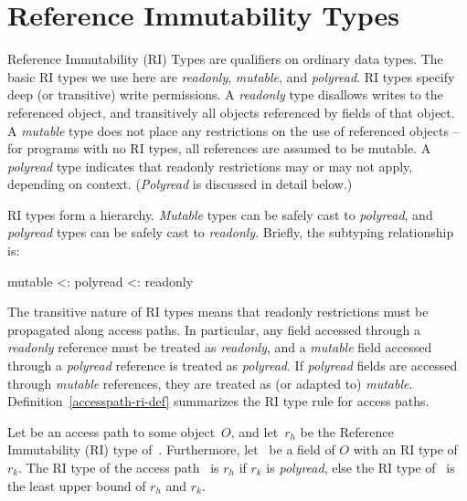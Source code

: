 
\section{Reference Immutability Types}

Reference Immutability (RI) Types are qualifiers on ordinary data types.
The basic RI types we use here are \emph{readonly}, \emph{mutable}, and \emph{polyread}.
RI types specify deep (or transitive) write permissions.
A \emph{readonly} type disallows writes to the referenced object, and transitively
all objects referenced by fields of that object.
A \emph{mutable} type does not place any restrictions on the use of referenced objects --
for programs with no RI types, all references are assumed to be mutable.
A \emph{polyread} type indicates that readonly restrictions may or may not apply,
depending on context. (\emph{Polyread} is discussed in detail below.)

RI types form a hierarchy.
\emph{Mutable} types can be safely cast to \emph{polyread},
and \emph{polyread} types can be safely cast to \emph{readonly}.
Briefly, the subtyping relationship is:

\begin{center}
	mutable <: polyread <: readonly
\end{center}

The transitive nature of RI types means that readonly restrictions must be
propagated along access paths.
In particular, any field accessed through a \emph{readonly} reference must
be treated as \emph{readonly}, and a \emph{mutable} field accessed through
a \emph{polyread} reference is treated as \emph{polyread}.
If \emph{polyread} fields are accessed through \emph{mutable} references,
they are treated as (or adapted to) \emph{mutable}.
Definition~\ref{accesspath-ri-def} summarizes the RI type rule for access paths.


\begin{definition}
	\label{accesspath-ri-def}
	Let  be an access path to some object~$O$, and let~$r_h$
	be the Reference Immutability (RI) type of~.
	Furthermore, let~ be a field of $O$ with an RI type of~$r_k$.
	The RI type of the access path~
	is $r_h$ if $r_k$
	is \emph{polyread}, else the RI type of~ is
	the least upper bound of $r_h$ and $r_k$.
\end{definition}

